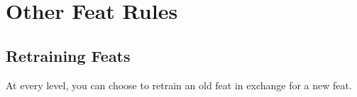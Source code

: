 \section{Other Feat Rules}

  \subsection{Retraining Feats}
    At every level, you can choose to retrain an old feat in exchange for a new feat.
